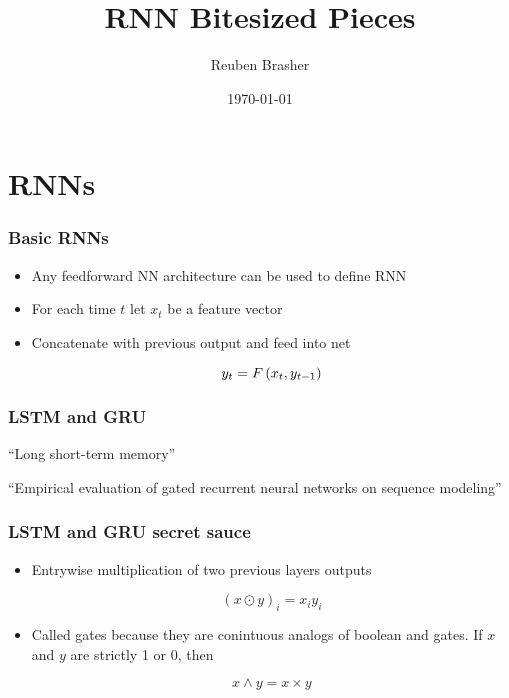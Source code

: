 \documentclass{beamer}
\title{RNN Bitesized Pieces}
\author{Reuben Brasher}
\date{\today}
\begin{document}
\frame{\titlepage}

\section[Outline]{}
\frame{\tableofcontents}

\section{RNNs}
\frame
{
   \frametitle{Basic RNNs}

   \begin{itemize}
      \item<1-> Any feedforward NN architecture can be used to define RNN

      \item<2-> For each time $t$ let $x_t$ be a feature vector
      
      \item<3-> Concatenate with previous output and feed into net

		$$y_t = F \left({x_t, y_{t-1}}\right)$$
      
   \end{itemize}
}

\frame
{
   \frametitle{LSTM and GRU}

   ``Long short-term memory''\cite{hochreiter1997long}

   ``Empirical evaluation of gated recurrent neural networks on sequence modeling''\cite{chung2014empirical}
}

\frame
{
   \frametitle{LSTM and GRU secret sauce}

   \begin{itemize}
      \item<1-> Entrywise multiplication of two previous layers outputs

      $$(x \odot y)_i = x_i y_i$$

      \item<2-> Called gates because they are conintuous analogs of boolean and gates. If $x$ and $y$ are strictly 1 or 0, then
      
      $$x \wedge y = x \times y$$

   \end{itemize}
}
\end{document}
